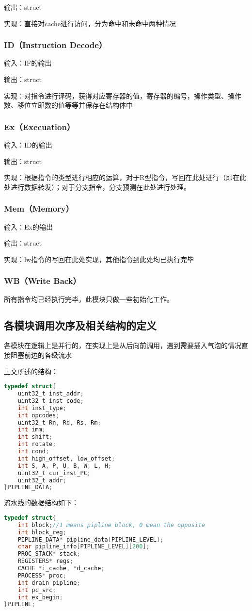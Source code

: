 \documentclass[12pt,a4paper]{article}
\begin{document}
输出：struct

实现：直接对cache进行访问，分为命中和未命中两种情况


\subsubsection{ID（Instruction Decode）}
输入：IF的输出

输出：struct

实现：对指令进行译码，获得对应寄存器的值，寄存器的编号，操作类型、操作数、移位立即数的值等等并保存在结构体中

\subsubsection{Ex（Execuation）}
输入：ID的输出

输出：struct

实现：根据指令的类型进行相应的运算，对于R型指令，写回在此处进行（即在此处进行数据转发）；对于分支指令，分支预测在此处进行处理。

\subsubsection{Mem（Memory）}
输入：Ex的输出

输出：struct

实现：lw指令的写回在此处实现，其他指令到此处均已执行完毕

\subsubsection{WB（Write Back）}
所有指令均已经执行完毕，此模块只做一些初始化工作。

\subsection{各模块调用次序及相关结构的定义}
各模块在逻辑上是并行的，在实现上是从后向前调用，遇到需要插入气泡的情况直接阻塞前边的各级流水

上文所述的结构：
	
\begin{lstlisting}[language={C}]
typedef struct{
    uint32_t inst_addr;
    uint32_t inst_code;
    int inst_type;
    int opcodes;
    uint32_t Rn, Rd, Rs, Rm;
    int imm;
    int shift;
    int rotate;
    int cond;
    int high_offset, low_offset;
    int S, A, P, U, B, W, L, H;
    uint32_t cur_inst_PC;
    uint32_t addr;
}PIPLINE_DATA;
\end{lstlisting}

流水线的数据结构如下：

\begin{lstlisting}[language={C}]
typedef struct{
    int block;//1 means pipline block, 0 mean the opposite
    int block_reg;
    PIPLINE_DATA* pipline_data[PIPLINE_LEVEL];
    char pipline_info[PIPLINE_LEVEL][200];
    PROC_STACK* stack;
    REGISTERS* regs;
    CACHE *i_cache, *d_cache;
    PROCESS* proc;
    int drain_pipline;
    int pc_src;
    int ex_begin;
}PIPLINE;
\end{lstlisting}
\end{document}
